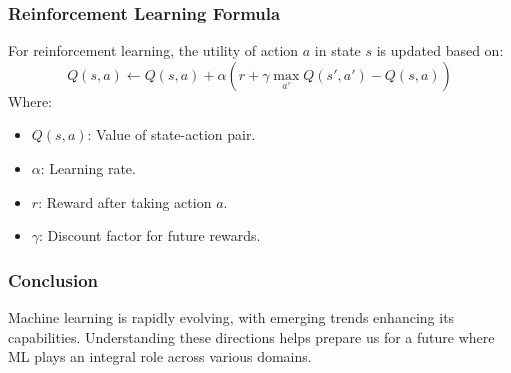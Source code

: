\documentclass[aspectratio=169]{beamer}
\begin{document}
\begin{frame}[fragile]
    \frametitle{Reinforcement Learning Formula}
    For reinforcement learning, the utility of action \( a \) in state \( s \) is updated based on:
    \begin{equation}
    Q(s, a) \leftarrow Q(s, a) + \alpha \left( r + \gamma \max_{a'} Q(s', a') - Q(s, a) \right)
    \end{equation}
    Where:
    \begin{itemize}
        \item \( Q(s, a) \): Value of state-action pair.
        \item \( \alpha \): Learning rate.
        \item \( r \): Reward after taking action \( a \).
        \item \( \gamma \): Discount factor for future rewards.
    \end{itemize}
\end{frame}

\begin{frame}[fragile]
    \frametitle{Conclusion}
    Machine learning is rapidly evolving, with emerging trends enhancing its capabilities. Understanding these directions helps prepare us for a future where ML plays an integral role across various domains.
\end{frame}
\end{document}
